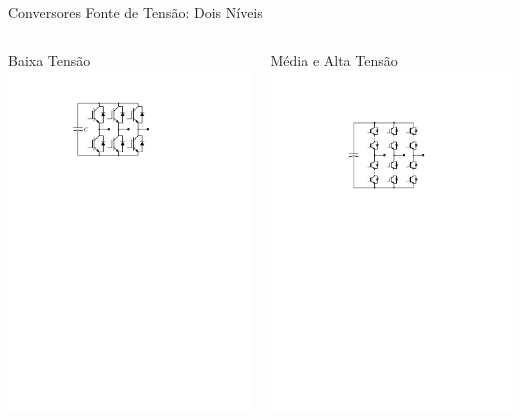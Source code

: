 \begin{frame}{Conversores Fonte de Tensão: Dois Níveis}


\begin{columns}

\centering

Baixa Tensão\\[20pt]

\includegraphics[width=0.6\linewidth]{./figuras/introducao/2niveis}


\centering


Média e Alta Tensão\\[20pt]

\includegraphics[width=0.55\linewidth]{./figuras/introducao/2niveis_alta}



\end{columns}





\end{frame}



